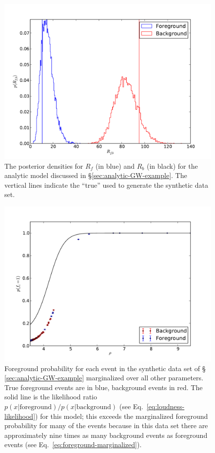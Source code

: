 \documentclass[aps,prd,reprint]{revtex4-1}
\begin{document}
\begin{figure}
  \includegraphics[width=\columnwidth]{rates}
  \caption{\label{fig:analytic-rate-recovery} The posterior densities
    for $R_f$ (in blue) and $R_b$ (in black) for the analytic model
    discussed in \S \ref{sec:analytic-GW-example}.  The vertical lines
    indicate the ``true'' used to generate the synthetic data set.}
\end{figure}

\begin{figure}
  \includegraphics[width=\columnwidth]{pfore}
  \caption{\label{fig:analytic-rate-foreground-probs} Foreground
    probability for each event in the synthetic data set of \S
    \ref{sec:analytic-GW-example} marginalized over all other
    parameters.  True foreground events are in blue, background events
    in red.  The solid line is the likelihood ratio
    $p(x|\mathrm{foreground})/p(x|\mathrm{background})$ (see
    Eq.~\eqref{eq:loudness-likelihood}) for this model; this exceeds
    the marginalized foreground probability for many of the events
    because in this data set there are approximately nine times as
    many background events as foreground events (see
    Eq.~\eqref{eq:foreground-marginalized}). }
\end{figure}
\end{document}
